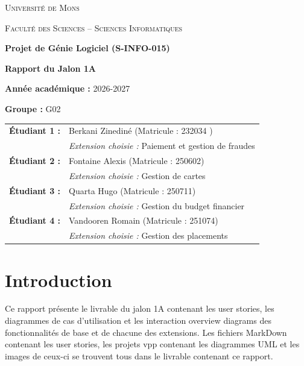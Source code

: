 \documentclass[11pt,a4paper]{article}
\begin{document}
\begin{titlepage}
    \centering
    {\scshape\LARGE Université de Mons \par}
    \vspace{1cm}
    {\scshape\Large Faculté des Sciences -- Sciences Informatiques\par}
    \vspace{1.5cm}
    {\huge\bfseries Projet de Génie Logiciel (S-INFO-015)\par}
    \vspace{0.5cm}
    {\Large\bfseries Rapport du Jalon 1A\par}
    \vspace{1.5cm}
    
    \textbf{Année académique :} 2026-2027\par
    \textbf{Groupe :} G02\par
    \vspace{1cm}

    \begin{tabular}{ll}
        \textbf{Étudiant 1 :} & Berkani Zinediné (Matricule : 232034 ) \\
        & \textit{Extension choisie :} Paiement et gestion de fraudes \\[0.2cm]
        \textbf{Étudiant 2 :} & Fontaine Alexis (Matricule : 250602) \\
        & \textit{Extension choisie :} Gestion de cartes \\[0.2cm]
        \textbf{Étudiant 3 :} & Quarta Hugo (Matricule : 250711) \\
        & \textit{Extension choisie :} Gestion du budget financier \\[0.2cm]
        \textbf{Étudiant 4 :} & Vandooren Romain (Matricule : 251074) \\
        & \textit{Extension choisie :} Gestion des placements \\
    \end{tabular}

\end{titlepage}

\newpage
\tableofcontents
\newpage

\section{Introduction}
Ce rapport présente le livrable du jalon 1A contenant les user stories, les diagrammes de cas d'utilisation et les interaction overview diagrams des fonctionnalités de base
et de chacune des extensions. Les fichiers MarkDown contenant les user stories, les projets vpp contenant les diagrammes UML et les images de ceux-ci se trouvent tous dans le livrable contenant ce rapport.
\end{document}
